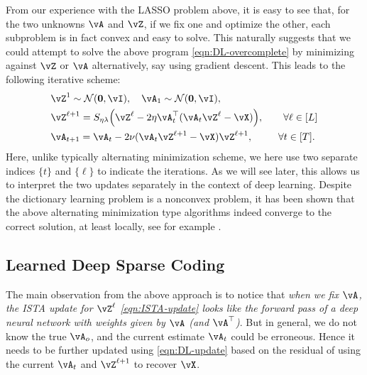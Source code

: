\documentclass[../../book-main.tex]{subfiles}
\begin{document}
From our experience with the LASSO problem above, it is easy to see that, for the two unknowns \(\vA\) and \(\vZ\), if we fix one and optimize the other, each subproblem is in fact convex and easy to solve. This naturally suggests that we could attempt to solve the above program \eqref{eqn:DL-overcomplete} by minimizing against \(\vZ\) or \(\vA\) alternatively, say using gradient descent. This leads to the following iterative scheme:
\begin{align}
    & \vZ^{1}
     \sim \dNorm(\vzero, \vI), \quad \vA_{1}
     \sim \dNorm(\vzero, \vI), \\ 
    &\vZ^{\ell + 1} = S_{\eta\lambda}\rp{\vZ^{\ell} - 2\eta\vA_{t}^{\top}(\vA_{t}\vZ^{\ell} - \vX)}, \qquad \forall \ell \in [L] \label{eqn:ISTA-update}\\ 
    &\vA_{t + 1} = \vA_{t} - 2\nu (\vA_{t}\vZ^{\ell + 1} - \vX)\vZ^{\ell + 1}, \qquad\;\; \forall t \in [T].\label{eqn:DL-update}
\end{align}
Here, unlike typically alternating minimization scheme, we here use two separate indices $\{t\}$ and $\{\ell\}$ to indicate the iterations. As we will see later, this allows us to interpret the two updates separately in the context of deep learning. Despite the dictionary learning problem is a nonconvex problem, it has been shown that the above alternating minimization type algorithms indeed converge to the correct solution, at least locally, see for example \cite{alekh-2016}.


\subsection{Learned Deep Sparse Coding}
\label{sec:LISTA}
The main observation from the above approach is to notice that \textit{when we fix \(\vA\), the ISTA update for $\vZ^\ell$ \eqref{eqn:ISTA-update} looks like the forward pass of a deep neural network with weights given by \(\vA\) (and \(\vA^{\top}\))}. But in general, we do not know the true $\vA_o$, and the current estimate $\vA_t$ could be erroneous. Hence it needs to be further updated using \eqref{eqn:DL-update} based on the residual of using the current $\vA_t$ and $\vZ^{\ell +1}$ to recover $\vX$. 
\end{document}
